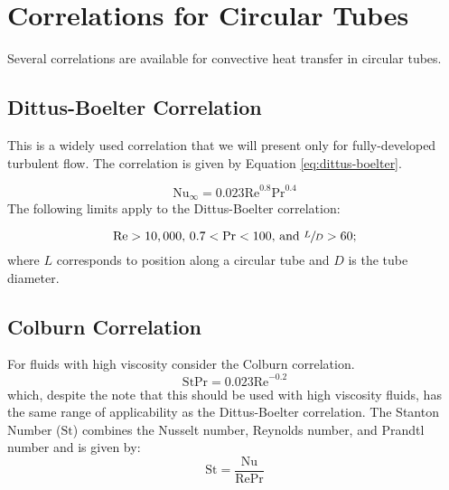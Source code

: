 \section{Correlations for Circular Tubes}
Several correlations are available for convective heat transfer in circular tubes.
\subsection{Dittus-Boelter Correlation} 
This is a widely used correlation\cite[-2.5cm]{dittus1985heat} that we will present only for fully-developed turbulent flow. The correlation is given by Equation \ref{eq:dittus-boelter}.

\begin{equation}
\text{Nu}_{\infty} = 0.023 \text{Re}^{0.8}\text{Pr}^{0.4}
\label{eq:dittus-boelter}
\end{equation}  The following limits apply to the Dittus-Boelter correlation: 

\begin{equation*}
\text{Re}>10,000\text{,  }0.7 < \text{Pr} < 100\text{, and }\sfrac{L}{D}>60;
\end{equation*} 
where $L$ corresponds to position along a circular tube and $D$ is the tube diameter.

\subsection{Colburn Correlation} 
For fluids with high viscosity consider the Colburn correlation.\cite{colburn1964method}
\begin{equation}
\text{St}\text{Pr}=0.023 \text{Re}^{-0.2}
\label{eq:colburn}
\end{equation}
which, despite the note that this should be used with high viscosity fluids, has the same range of applicability as the Dittus-Boelter correlation.  The Stanton Number ($\text{St}$) combines the Nusselt number, Reynolds number, and Prandtl number and is given by: 
\begin{equation}
\text{St} = \frac{\text{Nu}}{\text{Re}\text{Pr}}
\label{eq:stanton}
\end{equation}


